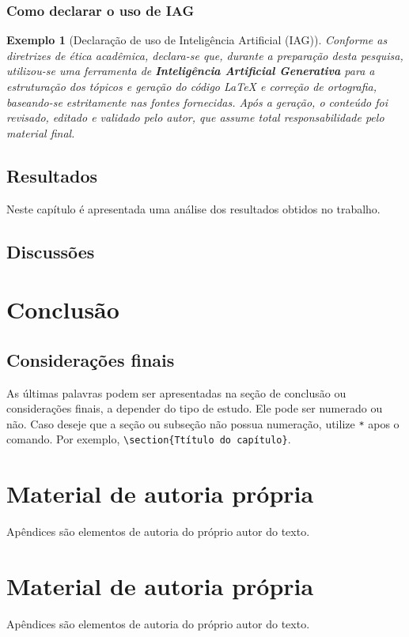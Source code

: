 \documentclass[
	12pt,				%
	openright,			%
	oneside,			%
	a4paper,			%
	english,			%
	brazil				%
	]{abntex2}
\newcommand{\caixa}[1]{%
	\begin{mdframed}[
		linewidth=1.5pt,
		leftmargin=10pt,%
		rightmargin=10pt,%
		linecolor=VinhoUFOP
	]{\small #1}
	\end{mdframed}
}
\newtheorem{exemplo}{Exemplo}
\begin{document}
\subsection*{Como declarar o uso de IAG} 
\caixa{\begin{exemplo}[Declaração de uso de Inteligência Artificial (IAG)] Conforme as diretrizes de ética acadêmica, declara-se que, durante a preparação desta pesquisa, utilizou-se uma ferramenta de \textbf{Inteligência Artificial Generativa} para a estruturação dos tópicos e geração do código LaTeX e correção de ortografia, baseando-se estritamente nas fontes fornecidas. Após a geração, o conteúdo foi revisado, editado e validado pelo autor, que assume total responsabilidade pelo material final.
\end{exemplo}
}

\section{Resultados} \label{cap:resultados}
Neste capítulo é apresentada uma análise dos resultados obtidos no trabalho.

\section{Discussões}

\chapter{Conclusão}

\section{Considerações finais}
As últimas palavras podem ser apresentadas na seção de conclusão ou considerações finais, a depender do tipo de estudo. Ele pode ser numerado ou não. Caso deseje que a seção ou subseção não possua numeração, utilize \verb*|*| apos o comando. Por exemplo, \verb|\section{Ttítulo do capítulo}|.

\postextual

\printbibliography[title=REFERÊNCIAS]

\begin{apendicesenv} %

\chapter{Material de autoria própria} \label{ape:A}
Apêndices são elementos de autoria do próprio autor do texto.
\chapter{Material de autoria própria} \label{ape:B}
Apêndices são elementos de autoria do próprio autor do texto.
\end{apendicesenv}
\end{document}
